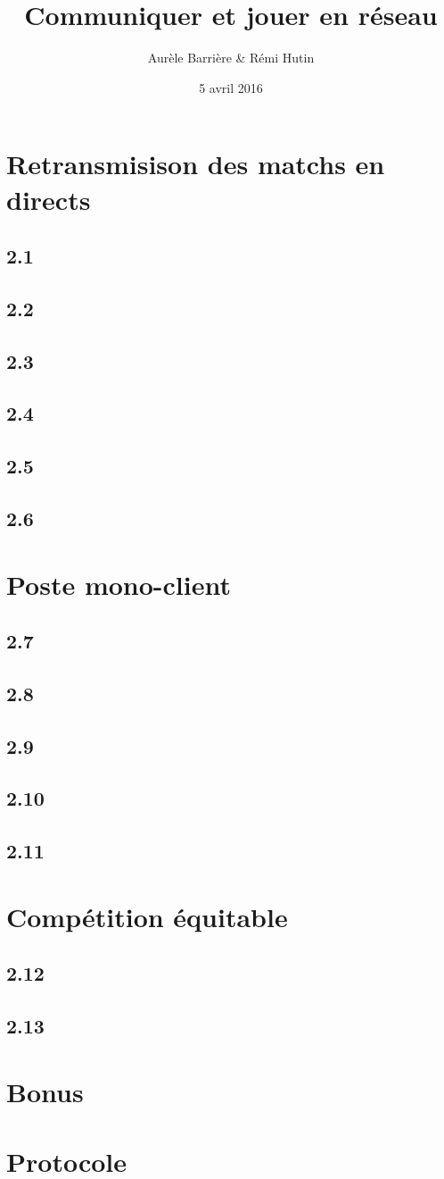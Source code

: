 \documentclass[12pt]{article}
\title{Communiquer et jouer en réseau}
\author{Aurèle Barrière \& Rémi Hutin}
\date{5 avril 2016}
\def\question#1{\subsection*{#1}}
\def\sec#1{\section{#1}}
\begin{document}
\maketitle
\tableofcontents

\sec{Retransmisison des matchs en directs}
\question{2.1}
\question{2.2}
\question{2.3}
\question{2.4}
\question{2.5}
\question{2.6}

\sec{Poste mono-client}
\question{2.7}
\question{2.8}
\question{2.9}
\question{2.10}
\question{2.11}

\sec{Compétition équitable}
\question{2.12}
\question{2.13}

\sec{Bonus}

\sec{Protocole}
\end{document}
